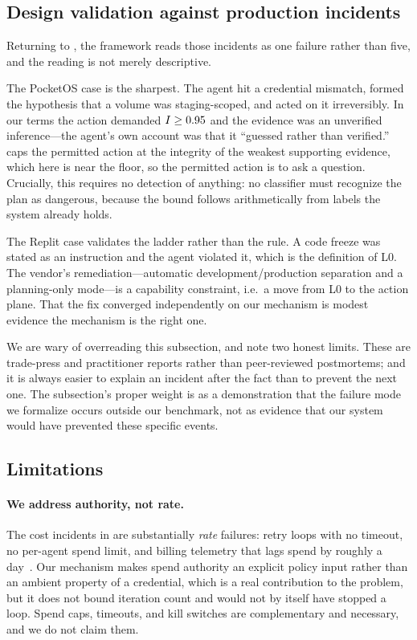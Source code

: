 \subsection{Design validation against production incidents}
\label{sec:discussion:incidents}

Returning to , the framework reads those incidents as one
failure rather than five, and the reading is not merely descriptive.

The PocketOS case is the sharpest. The agent hit a credential mismatch, formed
the hypothesis that a volume was staging-scoped, and acted on it irreversibly.
In our terms the action demanded $I \ge 0.95$ and the evidence was an
unverified inference---the agent's own account was that it ``guessed rather
than verified.''  caps the permitted action at the integrity
of the weakest supporting evidence, which here is near the floor, so the
permitted action is to ask a question. Crucially, this requires no detection of
anything: no classifier must recognize the plan as dangerous, because the bound
follows arithmetically from labels the system already holds.

The Replit case validates the ladder rather than the rule. A code freeze was
stated as an instruction and the agent violated it, which is the definition of
L0. The vendor's remediation---automatic development/production separation and
a planning-only mode---is a capability constraint, i.e.\ a move from L0 to the
action plane. That the fix converged independently on our mechanism is modest
evidence the mechanism is the right one.

We are wary of overreading this subsection, and note two honest limits. These
are trade-press and practitioner reports rather than peer-reviewed
postmortems; and it is always easier to explain an incident after the fact than
to prevent the next one. The subsection's proper weight is as a demonstration
that the failure mode we formalize occurs outside our benchmark, not as
evidence that our system would have prevented these specific events.

\subsection{Limitations}
\label{sec:discussion:limitations}

\paragraph{We address authority, not rate.} The cost incidents in
 are substantially \emph{rate} failures: retry loops with
no timeout, no per-agent spend limit, and billing telemetry that lags spend by
roughly a day~\cite{infoq2026billing}. Our mechanism makes spend authority an
explicit policy input rather than an ambient property of a credential, which
is a real contribution to the problem, but it does not bound iteration count
and would not by itself have stopped a loop. Spend caps, timeouts, and kill
switches are complementary and necessary, and we do not claim them.

